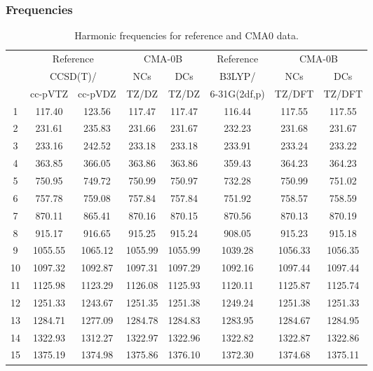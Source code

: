 \documentclass[10pt,oneside]{article}
\begin{document}
\clearpage

\subsubsection*{Frequencies}
\begin{table}[h!]
\centering
\caption{Harmonic frequencies for reference and CMA0 data.}
\begin{tabular}{cccccccc}
\toprule
{} & \multicolumn{2}{c}{Reference} & \multicolumn{2}{c}{CMA-0B} &    Reference & \multicolumn{2}{c}{CMA-0B} \\
{} & \multicolumn{2}{c}{CCSD(T)/} &     NCs &     DCs &       B3LYP/ &     NCs &     DCs \\
{} &   cc-pVTZ & cc-pVDZ &   TZ/DZ &   TZ/DZ & 6-31G(2df,p) &  TZ/DFT &  TZ/DFT \\
\midrule
1  &    117.40 &  123.56 &  117.47 &  117.47 &       116.44 &  117.55 &  117.55 \\
2  &    231.61 &  235.83 &  231.66 &  231.67 &       232.23 &  231.68 &  231.67 \\
3  &    233.16 &  242.52 &  233.18 &  233.18 &       233.91 &  233.24 &  233.22 \\
4  &    363.85 &  366.05 &  363.86 &  363.86 &       359.43 &  364.23 &  364.23 \\
5  &    750.95 &  749.72 &  750.99 &  750.97 &       732.28 &  750.99 &  751.02 \\
6  &    757.78 &  759.08 &  757.84 &  757.84 &       751.92 &  758.57 &  758.59 \\
7  &    870.11 &  865.41 &  870.16 &  870.15 &       870.56 &  870.13 &  870.19 \\
8  &    915.17 &  916.65 &  915.25 &  915.24 &       908.05 &  915.23 &  915.18 \\
9  &   1055.55 & 1065.12 & 1055.99 & 1055.99 &      1039.28 & 1056.33 & 1056.35 \\
10 &   1097.32 & 1092.87 & 1097.31 & 1097.29 &      1092.16 & 1097.44 & 1097.44 \\
11 &   1125.98 & 1123.29 & 1126.08 & 1125.93 &      1120.11 & 1125.87 & 1125.74 \\
12 &   1251.33 & 1243.67 & 1251.35 & 1251.38 &      1249.24 & 1251.38 & 1251.33 \\
13 &   1284.71 & 1277.09 & 1284.78 & 1284.83 &      1283.95 & 1284.67 & 1284.95 \\
14 &   1322.93 & 1312.27 & 1322.97 & 1322.96 &      1322.82 & 1322.87 & 1322.86 \\
15 &   1375.19 & 1374.98 & 1375.86 & 1376.10 &      1372.30 & 1374.68 & 1375.11 \\

\end{tabular}
\end{table}
\end{document}
